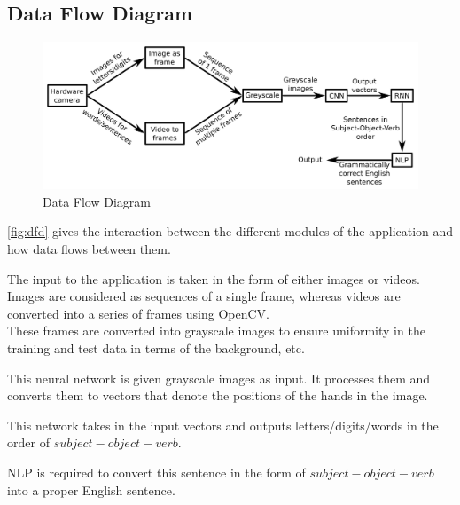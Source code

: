 \documentclass[12pt,oneside,a4paper]{article}
\begin{document}
		\subsection{Data Flow Diagram}

			\begin{figure}[htp]
				\centering
				\includegraphics{dfd.png}
				\caption{Data Flow Diagram}
				\label{fig:dfd}
			\end{figure}

			\autoref{fig:dfd} gives the interaction between the different modules of the application and how data flows between them. \\

			\begin{description}[style=nextline]

				\item[Input] The input to the application is taken in the form of either images or videos. Images are considered as sequences of a single frame, whereas videos are converted into a series of frames using OpenCV. \\
				These frames are converted into grayscale images to ensure uniformity in the training and test data in terms of the background, etc.

				\item[Convolutional Neural Network] This neural network is given grayscale images as input. It processes them and converts them to vectors that denote the positions of the hands in the image.

				\item[Recurrent Neural Network] This network takes in the input vectors and outputs letters/digits/words in the order of $subject - object - verb$.

				\item[Natural Language Processing module] NLP is required to convert this sentence in the form of $subject - object - verb$ into a proper English sentence.

			\end{description}
\end{document}
